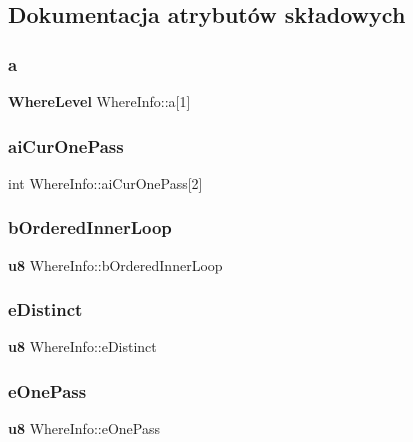 \subsection{Dokumentacja atrybutów składowych}
\mbox{\label{struct_where_info_a427337160cbeaf64b23a8241fb10dbf9}} 
\subsubsection{a}
{\footnotesize\ttfamily \textbf{ Where\+Level} Where\+Info\+::a[1]}

\mbox{\label{struct_where_info_a77e2c29eafad2f964cb36245f38178eb}} 
\subsubsection{aiCurOnePass}
{\footnotesize\ttfamily int Where\+Info\+::ai\+Cur\+One\+Pass[2]}

\mbox{\label{struct_where_info_a36b191a2f2c125b98f45b8d8dbb44a8b}} 
\subsubsection{bOrderedInnerLoop}
{\footnotesize\ttfamily \textbf{ u8} Where\+Info\+::b\+Ordered\+Inner\+Loop}

\mbox{\label{struct_where_info_a3dd0b1738e0e2fbf5ab61c00939ab532}} 
\subsubsection{eDistinct}
{\footnotesize\ttfamily \textbf{ u8} Where\+Info\+::e\+Distinct}

\mbox{\label{struct_where_info_a976db5ecfd4366411b97c113f4193b93}} 
\subsubsection{eOnePass}
{\footnotesize\ttfamily \textbf{ u8} Where\+Info\+::e\+One\+Pass}

\mbox{\label{struct_where_info_a338ac73b84c81db455ad7db56b5e4a06}} 
